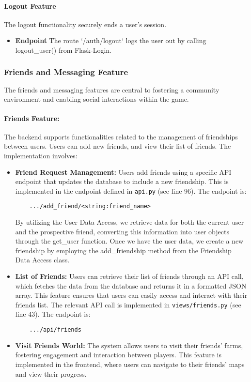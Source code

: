 \documentclass[12pt]{article}
\begin{document}
\paragraph{Logout Feature}
The logout functionality securely ends a user's session.
\begin{itemize}
    \item \textbf{Endpoint} The route `/auth/logout` logs the user out by calling logout\_user() from Flask-Login.
\end{itemize}
\subsubsection{Friends and Messaging Feature}
The friends and messaging features are central to fostering a community environment and enabling social interactions within the game.
\paragraph{Friends Feature:}
The backend supports functionalities related to the management of friendships between users. Users can add new friends, and view their list of friends. The implementation involves:
\begin{itemize}
    \item \textbf{Friend Request Management:} Users add friends using a specific API endpoint that updates the database to include a new friendship. This is implemented in the endpoint defined in \texttt{api.py} (see line 96). The endpoint is:
    \begin{verbatim}
    .../add_friend/<string:friend_name>
    \end{verbatim}
    By utilizing the User Data Access, we retrieve data for both the current user and the prospective friend, converting this information into user objects through the get\_user function. Once we have the user data, we create a new friendship by employing the add\_friendship method from the Friendship Data Access class.
    \item \textbf{List of Friends:} Users can retrieve their list of friends through an API call, which fetches the data from the database and returns it in a formatted JSON array. This feature ensures that users can easily access and interact with their friends list. The relevant API call is implemented in \texttt{views/friends.py} (see line 43). The endpoint is:
    \begin{verbatim}
    .../api/friends
    \end{verbatim}
    \item \textbf{Visit Friends World:} The system allows users to visit their friends' farms, fostering engagement and interaction between players. This feature is implemented in the frontend, where users can navigate to their friends' maps and view their progress.
\end{itemize}
\end{document}
